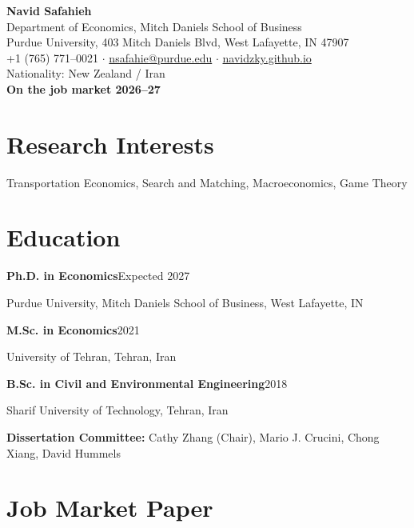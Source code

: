 \documentclass[11pt]{article}
\newcommand{\entry}[2]{%
  \needspace{2\baselineskip}%
  \textbf{#1}\hfill #2\par}
\begin{document}
\begin{center}
  {\LARGE\bfseries Navid Safahieh}\\[0.5em]
  Department of Economics, Mitch Daniels School of Business\\
  Purdue University, 403 Mitch Daniels Blvd, West Lafayette, IN 47907\\[0.3em]
  +1 (765) 771--0021 \quad$\cdot$\quad
  \href{mailto:nsafahie@purdue.edu}{nsafahie@purdue.edu} \quad$\cdot$\quad
  \href{https://navidzky.github.io}{navidzky.github.io}\\[0.2em]
  Nationality: New Zealand / Iran\\[0.4em]
  \textbf{On the job market 2026--27}
\end{center}

\section{Research Interests}
Transportation Economics, Search and Matching, Macroeconomics, Game Theory

\section{Education}

\entry{Ph.D. in Economics}{Expected 2027}
Purdue University, Mitch Daniels School of Business, West Lafayette, IN\par\vspace{0.4em}

\entry{M.Sc. in Economics}{2021}
University of Tehran, Tehran, Iran\par\vspace{0.4em}

\entry{B.Sc. in Civil and Environmental Engineering}{2018}
Sharif University of Technology, Tehran, Iran\par\vspace{0.5em}

\textbf{Dissertation Committee:} Cathy Zhang (Chair), Mario J. Crucini, Chong Xiang, David Hummels

\section{Job Market Paper}
\end{document}
